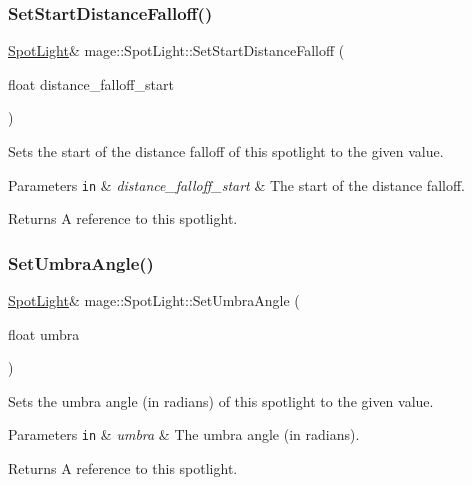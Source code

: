 \subsubsection{\texorpdfstring{Set\+Start\+Distance\+Falloff()}{SetStartDistanceFalloff()}}
{\footnotesize\ttfamily \hyperlink{classmage_1_1_spot_light}{Spot\+Light}\& mage\+::\+Spot\+Light\+::\+Set\+Start\+Distance\+Falloff (\begin{DoxyParamCaption}\item[{float}]{distance\+\_\+falloff\+\_\+start }\end{DoxyParamCaption})\hspace{0.3cm}{\ttfamily [noexcept]}}

Sets the start of the distance falloff of this spotlight to the given value.


\begin{DoxyParams}[1]{Parameters}
\mbox{\tt in}  & {\em distance\+\_\+falloff\+\_\+start} & The start of the distance falloff. \\
\hline
\end{DoxyParams}
\begin{DoxyReturn}{Returns}
A reference to this spotlight. 
\end{DoxyReturn}
\hypertarget{classmage_1_1_spot_light_a2ed52e8084bda7caffdc8c8e19ee2193}{}\label{classmage_1_1_spot_light_a2ed52e8084bda7caffdc8c8e19ee2193} 
\subsubsection{\texorpdfstring{Set\+Umbra\+Angle()}{SetUmbraAngle()}}
{\footnotesize\ttfamily \hyperlink{classmage_1_1_spot_light}{Spot\+Light}\& mage\+::\+Spot\+Light\+::\+Set\+Umbra\+Angle (\begin{DoxyParamCaption}\item[{float}]{umbra }\end{DoxyParamCaption})\hspace{0.3cm}{\ttfamily [noexcept]}}

Sets the umbra angle (in radians) of this spotlight to the given value.


\begin{DoxyParams}[1]{Parameters}
\mbox{\tt in}  & {\em umbra} & The umbra angle (in radians). \\
\hline
\end{DoxyParams}
\begin{DoxyReturn}{Returns}
A reference to this spotlight. 
\end{DoxyReturn}


